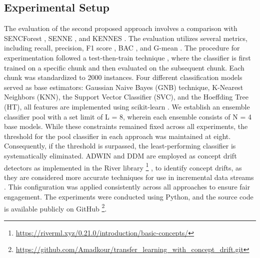\subsection{Experimental Setup}
\label{sec:setup}
The evaluation of the second proposed approach involves a comparison with SENCForest \cite{mu2017classification}, SENNE \cite{yang2021concept}, and KENNES \cite{zhang2022knnens}. The evaluation utilizes several metrics, including recall, precision, F1 score \cite{sasaki2007truth}, BAC \cite{brodersen2010balanced}, and G-mean \cite{kubat1997addressing}. The procedure for experimentation followed a test-then-train technique \cite{krawczyk2017ensemble}, where the classifier is first trained on a specific chunk and then evaluated on the subsequent chunk. Each chunk was standardized to 2000 instances. Four different classification models served as base estimators: Gaussian Naive Bayes (GNB) technique, K-Nearest Neighbors (KNN), the Support Vector Classifier (SVC), and the Hoeffding Tree (HT), all features are implemented using scikit-learn \cite{ksieniewicz2022stream}. We establish an ensemble classifier pool with a set limit of L = 8, wherein each ensemble consists of N = 4 base models. While these constraints remained fixed across all experiments, the threshold for the pool classifier in each approach was maintained at eight. Consequently, if the threshold is surpassed, the least-performing classifier is systematically eliminated. ADWIN \cite{adams2023explainable} and DDM \cite{gama2004learning} are employed as concept drift detectors as implemented in the River library \footnote{\url{https://riverml.xyz/0.21.0/introduction/basic-concepts/}} , to identify concept drifts, as they are considered more accurate techniques for use in incremental data streams \cite{gama2004learning,adams2023explainable,madkour2023historical,baena2006early}. This configuration was applied consistently across all approaches to ensure fair engagement. The experiments were conducted using Python, and the source code is available publicly on GitHub \footnote{\url{https://github.com/Amadkour/transfer_learning_with_concept_drift.git}}.
